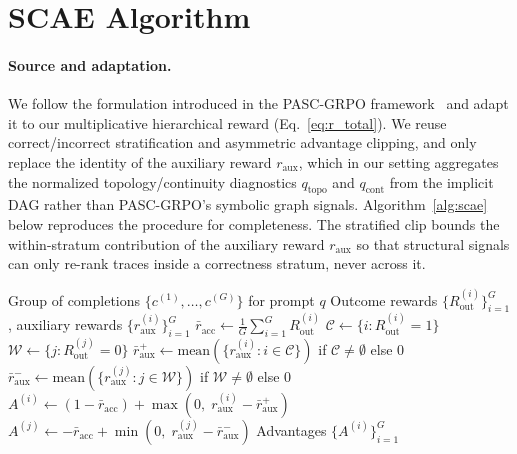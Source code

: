     \section{SCAE Algorithm}
    \label{app:scae}
    
    \paragraph{Source and adaptation.}
    We follow the formulation introduced in the PASC-GRPO framework~\citet{liu2026graph} and adapt it to our multiplicative hierarchical reward (Eq.~\ref{eq:r_total}). We reuse correct/incorrect stratification and asymmetric advantage clipping, and only replace the identity of the auxiliary reward $r_{\mathrm{aux}}$, which in our setting aggregates the normalized topology/continuity diagnostics $q_{\mathrm{topo}}$ and $q_{\mathrm{cont}}$
    from the implicit DAG rather than PASC-GRPO's symbolic graph signals. Algorithm~\ref{alg:scae} below reproduces the procedure for completeness. The stratified clip bounds the within-stratum contribution of the auxiliary reward $r_{\mathrm{aux}}$ so that structural signals can only re-rank traces inside a correctness stratum, never across it.
    
    \begin{algorithm}[H]
    \caption{Stratified Clipping Advantage Estimation (SCAE)}
    \label{alg:scae}
    \begin{algorithmic}[1]
    \Require Group of completions $\{c^{(1)}, \ldots, c^{(G)}\}$ for prompt $q$
    \Require Outcome rewards $\{R_\mathrm{out}^{(i)}\}_{i=1}^G$, auxiliary rewards $\{r_\mathrm{aux}^{(i)}\}_{i=1}^G$
    \State $\bar{r}_\mathrm{acc} \leftarrow \frac{1}{G}\sum_{i=1}^G R_\mathrm{out}^{(i)}$
    \State $\mathcal{C} \leftarrow \{i : R_\mathrm{out}^{(i)} = 1\}$ 
    \State $\mathcal{W} \leftarrow \{j : R_\mathrm{out}^{(j)} = 0\}$ 
    \State $\bar{r}_\mathrm{aux}^+ \leftarrow \mathrm{mean}(\{r_\mathrm{aux}^{(i)} : i \in \mathcal{C}\})$ if $\mathcal{C} \neq \emptyset$ else $0$
    \State $\bar{r}_\mathrm{aux}^- \leftarrow \mathrm{mean}(\{r_\mathrm{aux}^{(j)} : j \in \mathcal{W}\})$ if $\mathcal{W} \neq \emptyset$ else $0$
        \State $A^{(i)} \leftarrow (1 - \bar{r}_\mathrm{acc}) + \max(0,\; r_\mathrm{aux}^{(i)} - \bar{r}_\mathrm{aux}^+)$
    \EndFor
        \State $A^{(j)} \leftarrow -\bar{r}_\mathrm{acc} + \min(0,\; r_\mathrm{aux}^{(j)} - \bar{r}_\mathrm{aux}^-)$
    \EndFor
    \Return Advantages $\{A^{(i)}\}_{i=1}^G$
    \end{algorithmic}
    \end{algorithm}
    
